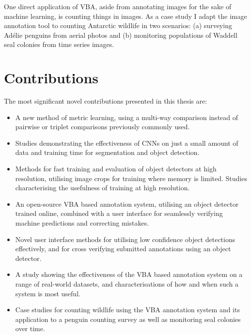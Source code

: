 One direct application of \gls{VBA}, aside from annotating images for the sake of machine learning, is counting things in images. As a case study I adapt the image annotation tool to counting Antarctic wildlife in two scenarios: (a) surveying Ad\'elie penguins from aerial photos and (b) monitoring populations of Waddell seal colonies from time series images.

\section {Contributions}
\label{sec: contributions}

The most significant novel contributions presented in this thesis are:

\begin{itemize}

    \item A new method of metric learning, using a multi-way comparison instead of pairwise or triplet comparisons previously commonly used.
    
    \item Studies demonstrating the effectiveness of \gls{CNN}s on just a small amount of data and training time for segmentation and object detection.
    
    \item Methods for fast training and evaluation of object detectors at high resolution, utilising image crops for training where memory is limited. Studies characterising the usefulness of training at high resolution.    
    
    \item An open-source \gls{VBA} based annotation system, utilising an object detector trained online, combined with a user interface for seamlessly verifying machine predictions and correcting mistakes.

    \item Novel user interface methods for utilising low confidence object detections effectively, and for cross verifying submitted annotations using an object detector.
    
    \item A study showing the effectiveness of the \gls{VBA} based annotation system on a range of real-world datasets, and characterisations of how and when such a system is most useful.
    
    \item Case studies for counting wildlife using the \gls{VBA} annotation system and its application to a penguin counting survey as well as monitoring seal colonies over time. 
    
\end{itemize}

